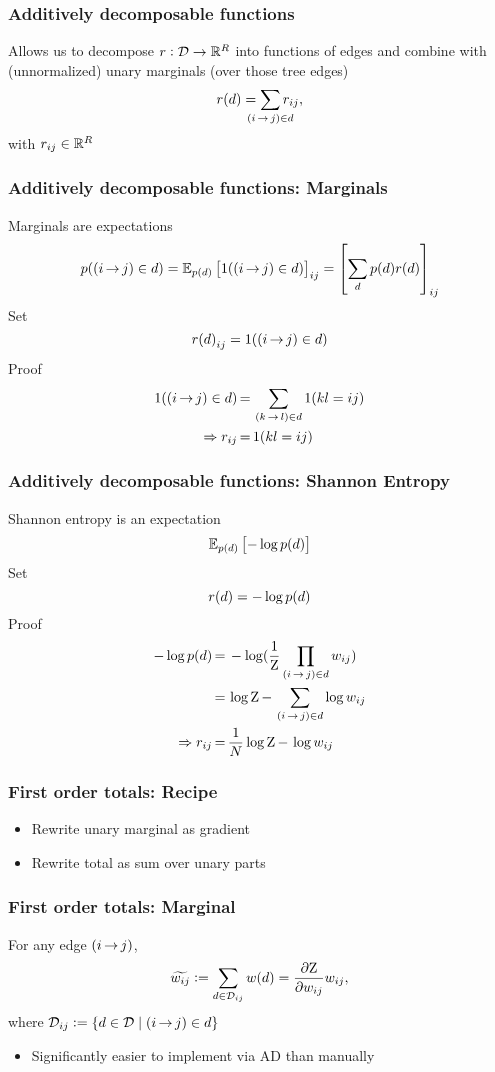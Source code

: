 \documentclass{beamer}
\newcommand{\defeq}{\vcentcolon=}
\begin{document}
\begin{frame}
\frametitle{Additively decomposable functions}
Allows us to decompose $r:\mathcal{D}\to\mathbb{R}^{R}$
into functions of edges and combine with (unnormalized)
unary marginals (over those tree edges)
\begin{equation}
    \rtree{\tree} = \smashoperator{\sum_{\edgeij\in\tree}}\redge{ij},
\end{equation}
with ${r_{ij}}\in\mathbb{R}^{R}$
\end{frame}

\begin{frame}
\frametitle{Additively decomposable functions: Marginals}
Marginals are expectations
$$p({(i\,{\rightarrow}\,j)}\in{d}) = \mathbb{E}_{{p({d})}}\left[1({(i\,{\rightarrow}\,j)}\in{d})\right]_{ij}
= \left[\sum_d p(d)r(d)\right]_{ij}$$
Set
$${r({d})}_{ij} = 1({(i\,{\rightarrow}\,j)}\in{d})$$
Proof
\begin{align*}
1({(i\,{\rightarrow}\,j)}\in{d}) &\,{=}\, \sum_{{(k\,{\rightarrow}\,l)}\in{d}}1(kl = ij)\\
\Rightarrow {r_{ij}} &\,{=}\, 1(kl=ij)
\end{align*}
\end{frame}

\begin{frame}
\frametitle{Additively decomposable functions: Shannon Entropy}
Shannon entropy is an expectation
$$\mathbb{E}_{{p({d})}}\left[-\log {p({d})}\right]$$
Set
$${r({d})} = -\log {p({d})}$$
Proof
\begin{align*}
-\log {p({d})} &\,{=}\, -\log(\frac{1}{{\mathrm{Z}}} \prod_{{(i\,{\rightarrow}\,j)}\in{d}} {w_{ij}})\\
&\,{=}\, \log{\mathrm{Z}} \,{-}\, \sum_{{(i\,{\rightarrow}\,j)} \in {d}} \log{w_{ij}}\\
\Rightarrow {r_{ij}} &\,{=}\, \frac{1}{{N}}\log{\mathrm{Z}}\,{-}\,\log{w_{ij}}
\end{align*}
\end{frame}

\begin{frame}
\frametitle{First order totals: Recipe}
\begin{itemize}
\item Rewrite unary marginal as gradient
\item Rewrite total as sum over unary parts
\end{itemize}
\end{frame}

\begin{frame}
\frametitle{First order totals: Marginal}
For any edge ${(i\,{\rightarrow}\,j)}$,
\begin{equation}
    \totalw{ij} \defeq \sum_{\tree\in\inc{ij}}\wtree{\tree}=\frac{\partial \wbar}{\partial \wedge{ij}}\wedge{ij},
\end{equation}
where $\inc{ij}\defeq \{ \tree \in \st \mid \edgeij \in \tree \}$
\vspace{2em}
\begin{itemize}
\item Significantly easier to implement via AD than manually
\end{itemize}
\end{frame}
\end{document}
